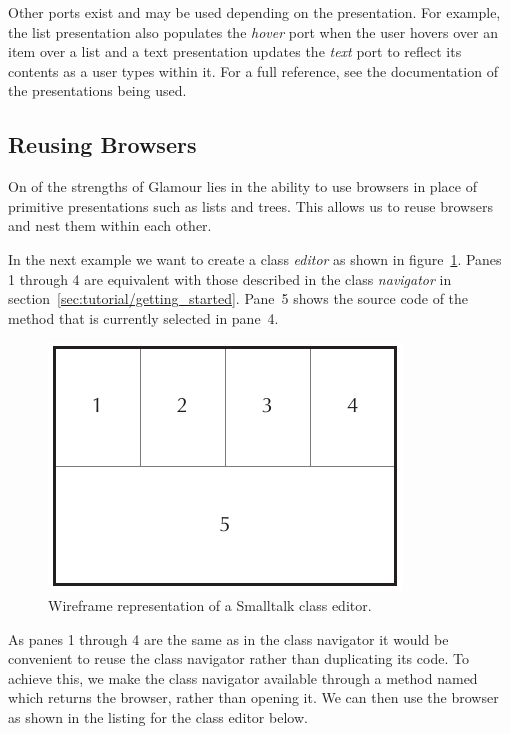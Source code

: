 \documentclass[a4paper,10pt,twoside]{book}
\begin{document}
Other ports exist and may be used depending on the presentation. For example, the list presentation also populates the \emph{hover} port when the user hovers over an item over a list and a text presentation updates the \emph{text} port to reflect its contents as a user types within it. For a full reference, see the documentation of the presentations being used.


\subsection{Reusing Browsers}
\label{sec:tutorial/reusing-browsers}

On of the strengths of Glamour lies in the ability to use browsers in place of primitive presentations such as lists and trees. This allows us to reuse browsers and nest them within each other.

In the next example we want to create a class \emph{editor} as shown in figure~\ref{fig:classbrowser_wireframe}. Panes 1 through 4 are equivalent with those described in the class \emph{navigator} in section~\ref{sec:tutorial/getting_started}. Pane~5 shows the source code of the method that is currently selected in pane~4.

\begin{figure}[htbp]
\centerline{\includegraphics[width=\linewidth]{classbrowser_wireframe.pdf}}
\caption{Wireframe representation of a Smalltalk class editor.}
\label{fig:classbrowser_wireframe}
\end{figure}

As panes 1 through 4 are the same as in the class navigator it would be convenient to reuse the class navigator rather than duplicating its code. To achieve this, we make the class navigator available through a method named  which returns the browser, rather than opening it. We can then use the browser as shown in the listing for the class editor below.
\end{document}
